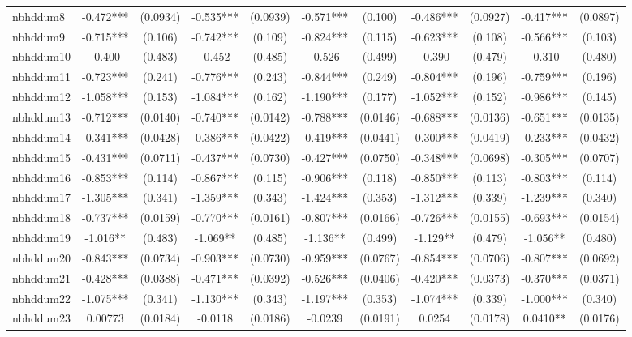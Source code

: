 \documentclass[]{article}
\begin{document}
\begin{tabular}{lcccccccccc}
nbhddum8 & -0.472*** & (0.0934) & -0.535*** & (0.0939) & -0.571*** & (0.100) & -0.486*** & (0.0927) & -0.417*** & (0.0897) \\
nbhddum9 & -0.715*** & (0.106) & -0.742*** & (0.109) & -0.824*** & (0.115) & -0.623*** & (0.108) & -0.566*** & (0.103) \\
nbhddum10 & -0.400 & (0.483) & -0.452 & (0.485) & -0.526 & (0.499) & -0.390 & (0.479) & -0.310 & (0.480) \\
nbhddum11 & -0.723*** & (0.241) & -0.776*** & (0.243) & -0.844*** & (0.249) & -0.804*** & (0.196) & -0.759*** & (0.196) \\
nbhddum12 & -1.058*** & (0.153) & -1.084*** & (0.162) & -1.190*** & (0.177) & -1.052*** & (0.152) & -0.986*** & (0.145) \\
nbhddum13 & -0.712*** & (0.0140) & -0.740*** & (0.0142) & -0.788*** & (0.0146) & -0.688*** & (0.0136) & -0.651*** & (0.0135) \\
nbhddum14 & -0.341*** & (0.0428) & -0.386*** & (0.0422) & -0.419*** & (0.0441) & -0.300*** & (0.0419) & -0.233*** & (0.0432) \\
nbhddum15 & -0.431*** & (0.0711) & -0.437*** & (0.0730) & -0.427*** & (0.0750) & -0.348*** & (0.0698) & -0.305*** & (0.0707) \\
nbhddum16 & -0.853*** & (0.114) & -0.867*** & (0.115) & -0.906*** & (0.118) & -0.850*** & (0.113) & -0.803*** & (0.114) \\
nbhddum17 & -1.305*** & (0.341) & -1.359*** & (0.343) & -1.424*** & (0.353) & -1.312*** & (0.339) & -1.239*** & (0.340) \\
nbhddum18 & -0.737*** & (0.0159) & -0.770*** & (0.0161) & -0.807*** & (0.0166) & -0.726*** & (0.0155) & -0.693*** & (0.0154) \\
nbhddum19 & -1.016** & (0.483) & -1.069** & (0.485) & -1.136** & (0.499) & -1.129** & (0.479) & -1.056** & (0.480) \\
nbhddum20 & -0.843*** & (0.0734) & -0.903*** & (0.0730) & -0.959*** & (0.0767) & -0.854*** & (0.0706) & -0.807*** & (0.0692) \\
nbhddum21 & -0.428*** & (0.0388) & -0.471*** & (0.0392) & -0.526*** & (0.0406) & -0.420*** & (0.0373) & -0.370*** & (0.0371) \\
nbhddum22 & -1.075*** & (0.341) & -1.130*** & (0.343) & -1.197*** & (0.353) & -1.074*** & (0.339) & -1.000*** & (0.340) \\
nbhddum23 & 0.00773 & (0.0184) & -0.0118 & (0.0186) & -0.0239 & (0.0191) & 0.0254 & (0.0178) & 0.0410** & (0.0176) \\

\end{tabular}
\end{document}
